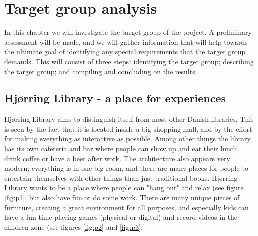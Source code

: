 \chapter{Target group analysis}
In this chapter we will investigate the target group of the project. A preliminary assessment will be made, and we will gather information that will help towards the ultimate goal of identifying any special requirements that the target group demands. This will consist of three steps: identifying the target group; describing the target group; and compiling and concluding on the results.

\section{Hj{\o}rring Library - a place for experiences}\label{hjoerring}
Hj{\o}rring Library aims to distinguish itself from most other Danish libraries. This is seen by the fact that it is located inside a big shopping mall, and by the effort for making everything as interactive as possible. Among other things the library has its own cafeteria and bar where people can show up and eat their lunch, drink coffee or have a beer after work. The architecture also appears very modern; everything is in one big room, and there are many places for people to entertain themselves with other things than just traditional books. Hj{\o}rring Library wants to be a place where people can "hang out" and relax (see figure \ref{fig:p1}, but also have fun or do some work. There are many unique pieces of furniture, creating a great environment for all purposes, and especially kids can have a fun time playing games (physical or digital) and record videos in the children zone (see figures \ref{fig:p2} and \ref{fig:p3}.

